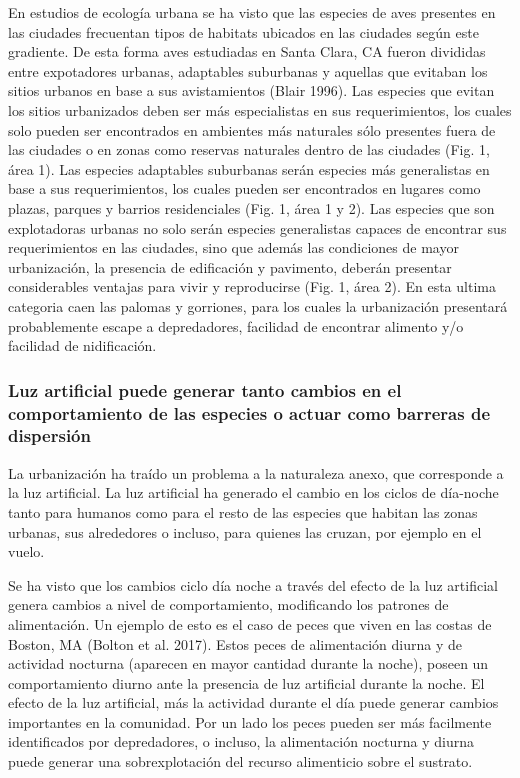 \documentclass[]{article}
\begin{document}
En estudios de ecología urbana se ha visto que las especies de aves
presentes en las ciudades frecuentan tipos de habitats ubicados en las
ciudades según este gradiente. De esta forma aves estudiadas en Santa
Clara, CA fueron divididas entre expotadores urbanas, adaptables
suburbanas y aquellas que evitaban los sitios urbanos en base a sus
avistamientos (Blair 1996). Las especies que evitan los sitios
urbanizados deben ser más especialistas en sus requerimientos, los
cuales solo pueden ser encontrados en ambientes más naturales sólo
presentes fuera de las ciudades o en zonas como reservas naturales
dentro de las ciudades (Fig. 1, área 1). Las especies adaptables
suburbanas serán especies más generalistas en base a sus requerimientos,
los cuales pueden ser encontrados en lugares como plazas, parques y
barrios residenciales (Fig. 1, área 1 y 2). Las especies que son
explotadoras urbanas no solo serán especies generalistas capaces de
encontrar sus requerimientos en las ciudades, sino que además las
condiciones de mayor urbanización, la presencia de edificación y
pavimento, deberán presentar considerables ventajas para vivir y
reproducirse (Fig. 1, área 2). En esta ultima categoria caen las palomas
y gorriones, para los cuales la urbanización presentará probablemente
escape a depredadores, facilidad de encontrar alimento y/o facilidad de
nidificación.

\subsubsection{Luz artificial puede generar tanto cambios en el
comportamiento de las especies o actuar como barreras de
dispersión}\label{luz-artificial-puede-generar-tanto-cambios-en-el-comportamiento-de-las-especies-o-actuar-como-barreras-de-dispersion}

La urbanización ha traído un problema a la naturaleza anexo, que
corresponde a la luz artificial. La luz artificial ha generado el cambio
en los ciclos de día-noche tanto para humanos como para el resto de las
especies que habitan las zonas urbanas, sus alrededores o incluso, para
quienes las cruzan, por ejemplo en el vuelo.

Se ha visto que los cambios ciclo día noche a través del efecto de la
luz artificial genera cambios a nivel de comportamiento, modificando los
patrones de alimentación. Un ejemplo de esto es el caso de peces que
viven en las costas de Boston, MA (Bolton et al. 2017). Estos peces de
alimentación diurna y de actividad nocturna (aparecen en mayor cantidad
durante la noche), poseen un comportamiento diurno ante la presencia de
luz artificial durante la noche. El efecto de la luz artificial, más la
actividad durante el día puede generar cambios importantes en la
comunidad. Por un lado los peces pueden ser más facilmente identificados
por depredadores, o incluso, la alimentación nocturna y diurna puede
generar una sobrexplotación del recurso alimenticio sobre el sustrato.
\end{document}
